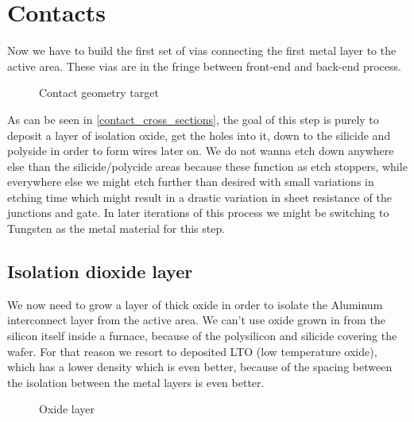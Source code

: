 \section{Contacts}\label{contact}

Now we have to build the first set of vias connecting the first metal layer to the active area.
These vias are in the fringe between front-end and back-end process.

\begin{figure}[H]
	\centering
	\begin{tikzpicture}[node distance = 3cm, auto, thick,scale=\CrossAndTopSectionBig, every node/.style={transform shape}]
		
	\end{tikzpicture}
	\caption{Contact geometry target}
	\label{contact_cross_sections}
\end{figure}

As can be seen in \autoref{contact_cross_sections}, the goal of this step is purely to deposit a layer of isolation oxide, get the holes into it, down to the silicide and polyside in order to form wires later on.
We do not wanna etch down anywhere else than the silicide/polycide areas because these function as etch stoppers, while everywhere else we might etch further than desired with small variations in etching time which might result in a drastic variation in sheet resistance of the junctions and gate.
In later iterations of this process we might be switching to Tungsten as the metal material for this step.

\newpage

\subsection{Isolation dioxide layer}

We now need to grow a layer of thick oxide in order to isolate the Aluminum interconnect layer from the active area.
We can't use oxide grown in from the silicon itself inside a furnace, because of the polysilicon and silicide covering the wafer.
For that reason we resort to deposited LTO (low temperature oxide), which has a lower density which is even better, because of the spacing between the isolation between the metal layers is even better.

\begin{figure}[H]
	\centering
	\begin{tikzpicture}[node distance = 3cm, auto, thick,scale=\CrossSectionOnly, every node/.style={transform shape}]
		
	\end{tikzpicture}
	\begin{tikzpicture}[node distance = 3cm, auto, thick,scale=\CrossSectionOnly, every node/.style={transform shape}]
		
	\end{tikzpicture}
	\caption{Oxide layer}
\end{figure}

